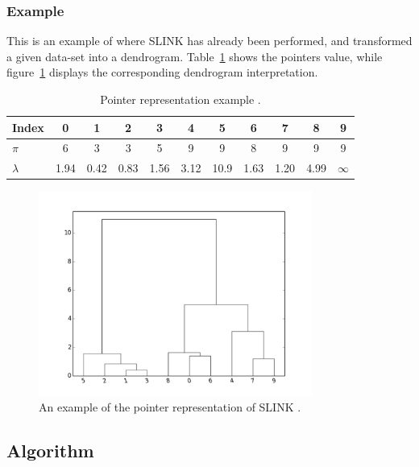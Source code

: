 \subsubsection{Example}
This is an example of where SLINK has already been performed, and transformed
a given data-set into a dendrogram. 
Table~\ref{table:pointer-representation-example} shows the pointers value, while
figure~\ref{fig:pointer-representation} displays the corresponding dendrogram 
interpretation. 

\begin{table}
    \centering
    {\begin{tabular}{ | l | c c c c c c c c c c | }
        \hline
        Index     & 0    & 1    & 2    & 3    & 4    & 5    & 6    & 7    & 8    & 9 \\
        \hline
        $\pi$     & 6    & 3    & 3    & 5    & 9    & 9    & 8    & 9    & 9    & 9 \\
        $\lambda$ & 1.94 & 0.42 & 0.83 & 1.56 & 3.12 & 10.9 & 1.63 & 1.20 & 4.99 & $\infty$ \\
        \hline
    \end{tabular}}
    \caption{Pointer representation example \cite{pointer-representation}.} 
    \label{table:pointer-representation-example}
\end{table}

\begin{figure}[ht]
    \centering
    \includegraphics[width=0.8\textwidth]{images/pointer_representation.pdf}
    \caption{An example of the pointer representation of SLINK
        \cite{pointer-representation}. \label{fig:pointer-representation} }
\end{figure}

\newpage

\subsection{Algorithm}

